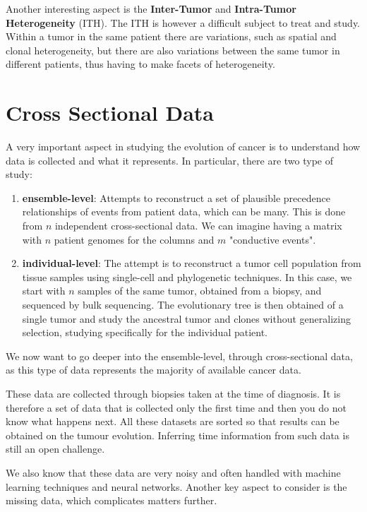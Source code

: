 Another interesting aspect is the \textbf{Inter-Tumor} and \textbf{Intra-Tumor Heterogeneity} 
(ITH). The ITH is however a difficult subject to treat and study. Within a tumor in the same
patient there are variations, such as spatial and clonal heterogeneity, but there are also 
variations between the same tumor in different patients, thus having to make facets of 
heterogeneity.
\section{Cross Sectional Data}
A very important aspect in studying the evolution of cancer is to understand how data is collected 
and what it represents. In particular, there are two type of study:
\begin{enumerate}
    \item \textbf{ensemble-level}: Attempts to reconstruct a set of plausible precedence 
        relationships of events from patient data, which can be many. This is done from $n$ 
        independent cross-sectional data. We can imagine having a matrix with $n$ patient 
        genomes for the columns and $m$ "conductive events".
    \item \textbf{individual-level}: The attempt is to reconstruct a tumor cell population 
        from tissue samples using single-cell and phylogenetic techniques. In this case, we 
        start with $n$ samples of the same tumor, obtained from a biopsy, and sequenced by 
        bulk sequencing. The evolutionary tree is then obtained of a single tumor and study 
        the ancestral tumor and clones without generalizing selection, studying specifically 
        for the individual patient.
\end{enumerate}

We now want to go deeper into the ensemble-level, through cross-sectional data, as this type of 
data represents the majority of available cancer data. 

These data are collected through biopsies taken at the time of diagnosis. It is therefore a set 
of data that is collected only the first time and then you do not know what happens next. All 
these datasets are sorted so that results can be obtained on the tumour evolution. Inferring 
time information from such data is still an open challenge. 

We also know that these data are very noisy and often handled with machine learning techniques 
and neural networks. Another key aspect to consider is the missing data, which complicates matters 
further.


